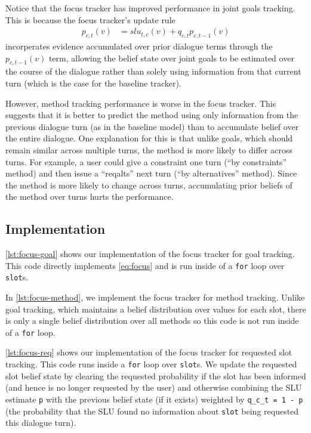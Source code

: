 \documentclass[a4paper,oneside,reqno]{amsart}
\begin{document}
Notice that the focus tracker has improved performance in joint goals tracking.
This is because the focus tracker's update rule
\begin{align}
  \label{eq:focus}
  p_{c,t}(v) &= slu_{t,c}(v) + q_{c,t} p_{c,t-1}(v)
\end{align}
incorperates evidence accumulated over prior dialogue terms through the $p_{c,t-1}(v)$
term, allowing the belief state over joint goals to be estimated over the course
of the dialogue rather than solely using information from that current turn (which is
the case for the baseline tracker).

However, method tracking performance is worse in the focus tracker. This
suggests that it is better to predict the method using only information from
the previous dialogue turn (as in the baseline model) than to accumulate belief
over the entire dialogue. One explanation for this is that unlike goals, which
should remain similar across multiple turns, the method is more likely to
differ across turns.  For example, a user could give a constraint one turn
(``by constraints'' method) and then issue a ``reqalts'' next turn (``by
alternatives'' method). Since the method is more likely to change across turns,
accumulating prior beliefs of the method over turns hurts the performance.

\subsection{Implementation}

\autoref{lst:focus-goal} shows our implementation of the focus tracker for goal
tracking. This code directly implements \autoref{eq:focus} and is run inside of
a \texttt{for} loop over \texttt{slot}s.



In \autoref{lst:focus-method}, we implement the focus tracker for method tracking.
Unlike goal tracking, which maintains a belief distribution over values for each slot,
there is only a single belief distribution over all methods so this code
is not run inside of a \texttt{for} loop.



\autoref{lst:focus-req} shows our implementation of the focus tracker for
requested slot tracking.  This code runs inside a \texttt{for} loop over
\texttt{slot}s. We update the requested slot belief state by clearing the
requested probability if the slot has been informed (and hence is no longer
requested by the user) and otherwise combining the SLU estimate \texttt{p} with
the previous belief state (if it exists) weighted by \texttt{q\_c\_t = 1 - p}
(the probability that the SLU found no information about \texttt{slot} being
requested this dialogue turn).
\end{document}
